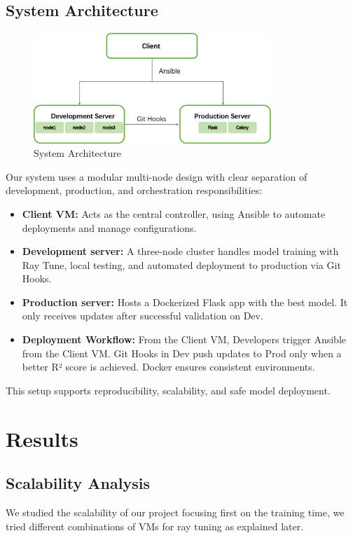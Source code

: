 \documentclass[12pt,a4paper]{article}
\begin{document}
\subsection{System Architecture}
\begin{figure}[H]
  \centering
  \includegraphics[width=0.8\textwidth]{System.png}
  \caption{System Architecture}
  \label{fig:my-image}
\end{figure}
Our system uses a modular multi-node design with clear separation of development, production, and orchestration responsibilities:
\begin{itemize}
    \item \textbf{Client VM:} Acts as the central controller, using Ansible to automate deployments and manage configurations.
    \item \textbf{Development server:} A three-node cluster handles model training with Ray Tune, local testing, and automated deployment to production via Git Hooks.
    \item \textbf{Production server:} Hosts a Dockerized Flask app with the best model. It only receives updates after successful validation on Dev.
    \item \textbf{Deployment Workflow:} From the Client VM,  Developers trigger Ansible from the Client VM. Git Hooks in Dev push updates to Prod only when a better R² score is achieved. Docker ensures consistent environments.
\end{itemize}

This setup supports reproducibility, scalability, and safe model deployment.

\section{Results}
\subsection{Scalability Analysis}
We studied the scalability of our project focusing first on the training time, we tried different combinations of VMs for ray tuning as explained later.
\end{document}
